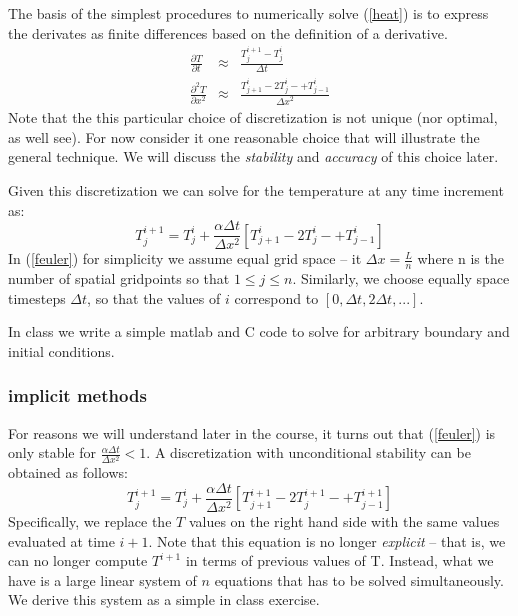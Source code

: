 \documentclass[11pt]{article}
\begin{document}
 The basis of the simplest procedures to numerically solve (\ref{heat}) is to express the derivates as finite differences based on the definition
 of a derivative.
 \begin{eqnarray*}
\frac{\partial T}{\partial t} &\approx& \frac{T_j^{i+1} -T_j^{i}}{\Delta t} \\
\frac{\partial^2 T}{\partial x^2} &\approx& \frac{T^i_{j+1} - 2 T^i_j -+T^i_{j-1}}{{\Delta x}^2}
\end{eqnarray*}
Note that the this particular choice of discretization is not unique (nor optimal, as well see). For now consider it one reasonable choice
that will illustrate the general technique. We will discuss the {\em stability} and {\em accuracy} of this choice later.

Given this discretization we can solve for the temperature at any time increment as:
\begin{equation}
\label{feuler}
T^{i+1}_j = T^i_j + \frac{\alpha \Delta t}{{\Delta x^2}}\left[T^i_{j+1} - 2 T^i_j -+T^i_{j-1}\right]
\end{equation}
In (\ref{feuler}) for simplicity we assume equal grid space -- it $\Delta x = \frac{L}{n}$ where n
is the number of spatial gridpoints so that $1 \le j \le n$. Similarly, we choose equally space
timesteps $\Delta t$, so that the values of $i$ correspond to $[0,\Delta t, 2\Delta t, ...]$.

In class we write a simple matlab and C code to solve for arbitrary boundary and initial conditions.

\subsubsection{implicit methods}
For reasons we will understand later in the course, it turns out that (\ref{feuler}) is only stable for
$\frac{\alpha \Delta t}{{\Delta x^2}} < 1$. A discretization with unconditional stability can be obtained
as follows:
\begin{equation}
T^{i+1}_j = T^i_j + \frac{\alpha \Delta t}{{\Delta x^2}}\left[T^{i+1}_{j+1} - 2 T^{i+1}_j -+T^{i+1}_{j-1}\right]
\end{equation}
Specifically, we replace the $T$ values on the right hand side with the same values evaluated at time $i+1$. 
Note that this equation is no longer {\em explicit} -- that is, we can no longer compute $T^{i+1}$ in terms of previous
values of T. Instead, what we have is a large linear system of $n$ equations that has to be solved simultaneously.
We derive this system as a simple in class exercise.
\end{document}
